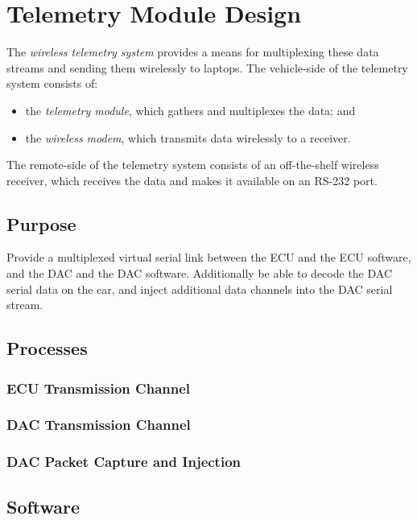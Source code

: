 \section{Telemetry Module Design\label{sec:Telemetry-Module-Design}}

The \emph{wireless telemetry system} provides a means for multiplexing these data streams and sending them wirelessly to laptops. The vehicle-side of the telemetry system consists of:

\begin{itemize}
\item the \emph{telemetry module}, which gathers and multiplexes the data; and
\item the \emph{wireless modem}, which transmits data wirelessly to a receiver.
\end{itemize}

The remote-side of the telemetry system consists of an off-the-shelf wireless receiver, which receives the data and makes it available on an RS-232 port.


\subsection{Purpose}

Provide a multiplexed virtual serial link between the ECU and the ECU software, and the DAC and the DAC software. Additionally be able to decode the DAC serial data on the car, and inject additional data channels into the DAC serial stream.


\subsection{Processes}


\subsubsection{ECU Transmission Channel}


\subsubsection{DAC Transmission Channel}


\subsubsection{DAC Packet Capture and Injection}


\subsection{Software}


